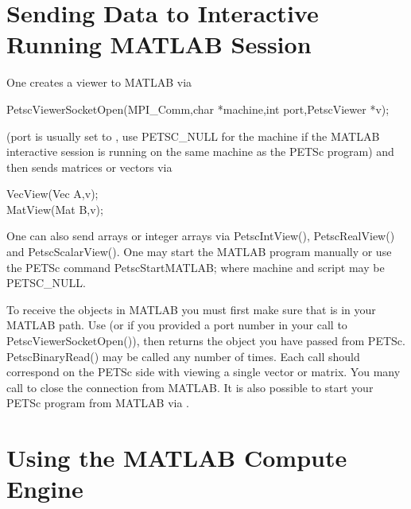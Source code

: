 \section{Sending Data to Interactive Running MATLAB Session}

One creates a viewer to MATLAB via
\begin{tabbing}
PetscViewerSocketOpen(MPI\_Comm,char *machine,int port,PetscViewer *v);
\end{tabbing}
(port is usually set to , use PETSC\_NULL for the machine if the
MATLAB interactive session is running on the same machine as the PETSc program)
and then sends matrices or vectors via
\begin{tabbing}
  VecView(Vec A,v);\\
  MatView(Mat B,v);
\end{tabbing}
One can also send arrays or integer arrays via PetscIntView(), PetscRealView() and PetscScalarView().
One may start the MATLAB program manually or use the PETSc command
PetscStartMATLAB; where machine and script may be PETSC\_NULL.

To receive the objects in MATLAB you must first make sure that 
is in your MATLAB path. Use  (or  if you provided a port number in
your call to PetscViewerSocketOpen()), then  returns the object you have passed from PETSc.
PetscBinaryRead() may be called any number of times. Each call should correspond on the PETSc side with
viewing a single vector or matrix. You many call  to close the connection from MATLAB.
It is also possible to start your PETSc program from MATLAB via .

\section{Using the MATLAB Compute Engine}

